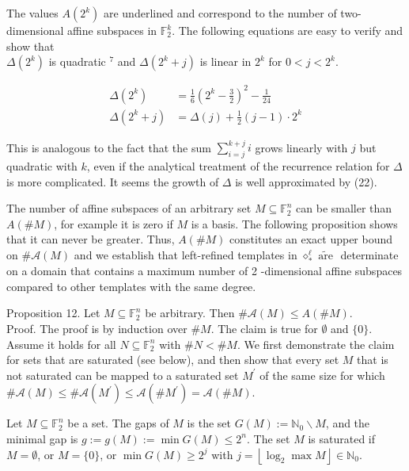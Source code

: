 \documentclass[10pt]{article}
\begin{document}
The values $A\left(2^{k}\right)$ are underlined and correspond to the number of two-dimensional affine subspaces in $\mathbb{F}_{2}^{k}$. The following equations are easy to verify and show that\\
$\Delta\left(2^{k}\right)$ is quadratic ${ }^{7}$ and $\Delta\left(2^{k}+j\right)$ is linear in $2^{k}$ for $0<j<2^{k}$.


\begin{align*}
\Delta\left(2^{k}\right) & =\frac{1}{6}\left(2^{k}-\frac{3}{2}\right)^{2}-\frac{1}{24}  \tag{22}\\
\Delta\left(2^{k}+j\right) & =\Delta(j)+\frac{1}{2}(j-1) \cdot 2^{k} \tag{23}
\end{align*}


This is analogous to the fact that the sum $\sum_{i=j}^{k+j} i$ grows linearly with $j$ but quadratic with $k$, even if the analytical treatment of the recurrence relation for $\Delta$ is more complicated. It seems the growth of $\Delta$ is well approximated by (22).

The number of affine subspaces of an arbitrary set $M \subseteq \mathbb{F}_{2}^{n}$ can be smaller than $A(\# M)$, for example it is zero if $M$ is a basis. The following proposition shows that it can never be greater. Thus, $A(\# M)$ constitutes an exact upper bound on $\# \mathcal{A}(M)$ and we establish that left-refined templates in $\diamond_{*}^{\ell} \widetilde{\text { are }}$ determinate on a domain that contains a maximum number of 2 -dimensional affine subspaces compared to other templates with the same degree.

Proposition 12. Let $M \subseteq \mathbb{F}_{2}^{n}$ be arbitrary. Then $\# \mathcal{A}(M) \leq A(\# M)$.\\
Proof. The proof is by induction over $\# M$. The claim is true for $\emptyset$ and $\{0\}$. Assume it holds for all $N \subseteq \mathbb{F}_{2}^{n}$ with $\# N<\# M$. We first demonstrate the claim for sets that are saturated (see below), and then show that every set $M$ that is not saturated can be mapped to a saturated set $M^{\prime}$ of the same size for which $\# \mathcal{A}(M) \leq \# \mathcal{A}\left(M^{\prime}\right) \leq \mathcal{A}\left(\# M^{\prime}\right)=\mathcal{A}(\# M)$.

Let $M \subseteq \mathbb{F}_{2}^{n}$ be a set. The gaps of $M$ is the set $G(M):=\mathbb{N}_{0} \backslash M$, and the minimal gap is $g:=g(M):=\min G(M) \leq 2^{n}$. The set $M$ is saturated if $M=\emptyset$, or $M=\{0\}$, or $\min G(M) \geq 2^{j}$ with $j=\left\lfloor\log _{2} \max M\right\rfloor \in \mathbb{N}_{0}$.
\end{document}
